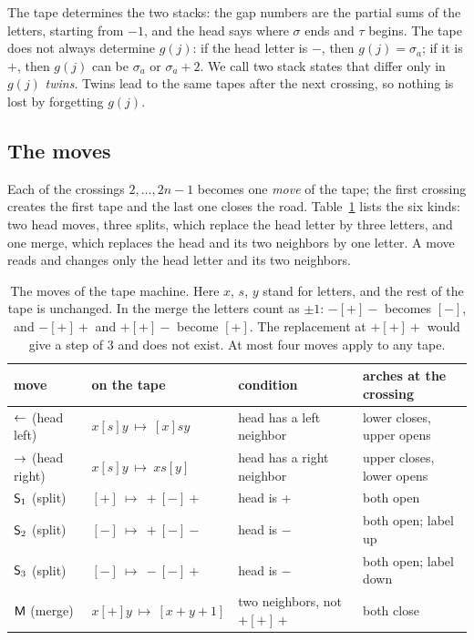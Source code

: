 The tape determines the two stacks: the gap numbers are the partial sums of the letters, starting from $-1$, and the
head says where $\sigma$ ends and $\tau$ begins. The tape does not always determine $g(j)$: if the head letter is $-$,
then $g(j)=\sigma_a$; if it is $+$, then $g(j)$ can be $\sigma_a$ or $\sigma_a+2$. We call two stack states that
differ only in $g(j)$ \emph{twins}. Twins lead to the same tapes after the next crossing, so nothing is lost by
forgetting $g(j)$.

\subsection{The moves}

Each of the crossings $2,\ldots,2n-1$ becomes one \emph{move} of the tape; the first crossing creates the first tape
and the last one closes the road. Table~\ref{tab:moves} lists the six kinds: two
head moves, three splits, which replace the head letter by three letters, and one merge, which replaces the head and
its two neighbors by one letter. A move reads and changes only the head letter and its two neighbors.

\begin{table}[htb]
\centering
\small
\renewcommand{\arraystretch}{1.2}
\begin{tabular}{llll}
\toprule
move & on the tape & condition & arches at the crossing \\
\midrule
$\mathord{\leftarrow}$ (head left) & $x[s]y\ \mapsto\ [x]sy$ & head has a left neighbor & lower closes, upper opens\\
$\mathord{\rightarrow}$ (head right) & $x[s]y\ \mapsto\ xs[y]$ & head has a right neighbor & upper closes, lower opens\\
$\mathsf{S}_1$ (split) & $[+]\ \mapsto\ +[-]+$ & head is $+$ & both open\\
$\mathsf{S}_2$ (split) & $[-]\ \mapsto\ +[-]-$ & head is $-$ & both open; label up\\
$\mathsf{S}_3$ (split) & $[-]\ \mapsto\ -[-]+$ & head is $-$ & both open; label down\\
$\mathsf{M}$ (merge) & $x[+]y\ \mapsto\ [x+y+1]$ & two neighbors, not $+[+]+$ & both close\\
\bottomrule
\end{tabular}
\caption{The moves of the tape machine. Here $x$, $s$, $y$ stand for letters, and the rest of the tape is
unchanged. In the merge the letters count as $\pm1$: $-[+]-$ becomes $[-]$, and
$-[+]+$ and $+[+]-$ become $[+]$. The replacement at $+[+]+$ would give a step of $3$ and does not exist. At most four
moves apply to any tape.}
\label{tab:moves}
\end{table}


